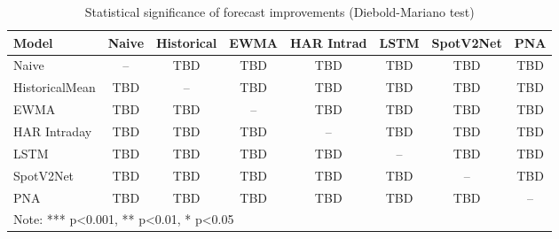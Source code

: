 \documentclass[journal]{IEEEtran}
\begin{document}
\begin{table}[!t]
\centering
\caption{Statistical significance of forecast improvements (Diebold-Mariano test)}
\label{tab:statistical_tests}
\begin{tabular}{lccccccc}
\toprule
Model & Naive & Historical & EWMA & HAR Intrad & LSTM & SpotV2Net & PNA \\
\midrule
Naive & -- & TBD & TBD & TBD & TBD & TBD & TBD \\
HistoricalMean & TBD & -- & TBD & TBD & TBD & TBD & TBD \\
EWMA & TBD & TBD & -- & TBD & TBD & TBD & TBD \\
HAR Intraday & TBD & TBD & TBD & -- & TBD & TBD & TBD \\
LSTM & TBD & TBD & TBD & TBD & -- & TBD & TBD \\
SpotV2Net & TBD & TBD & TBD & TBD & TBD & -- & TBD \\
PNA & TBD & TBD & TBD & TBD & TBD & TBD & -- \\
\bottomrule
\multicolumn{8}{l}{\footnotesize Note: *** p<0.001, ** p<0.01, * p<0.05}
\end{tabular}
\end{table}
\end{document}
